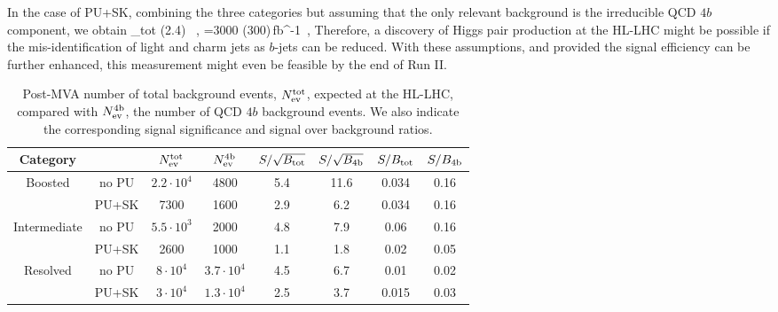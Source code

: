     
    In the case of PU+SK, combining the three categories but assuming that
    the only relevant background is the irreducible QCD $4b$ component,
    we obtain
    \be
\lp {}\rp_{\rm tot} (2.4) \, ,\quad
{}=3000 (300)\,{\rm fb}^{-1}\, ,
\ee
Therefore, a discovery of Higgs pair production at the
HL-LHC might be possible if the
mis-identification of light and charm jets as
$b$-jets can be  reduced.
%
With these assumptions, and provided
the signal efficiency can be further enhanced,
this measurement might even be feasible
by the end of Run II.


\begin{table}[h]
  \centering
  \small
  \begin{tabular}{|c|c|c|c||c|c||c|c|}
        \hline
        Category  &    &  $N_{\rm ev}^{\rm tot}$  &  $N_{\rm ev}^{\rm 4b}$   &
        $S/\sqrt{B_{\rm tot}}$ & $S/\sqrt{B_{\rm 4b}}$  
        &  $S/B_{\rm tot}$ & $S/B_{\rm 4b}$\\ 
    \hline
    \hline
    \multirow{2}{*}{Boosted} &  no PU  & $2.2\cdot 10^4$  & 4800    & 
      5.4 &  11.6 & 0.034 & 0.16 \\
    & PU+SK & 7300  &  1600  &  2.9  & 6.2 &  0.034 & 0.16 \\
    \hline
    \hline
    \multirow{2}{*}{Intermediate} &  no PU   & $5.5\cdot 10^3$  & 2000    &
    4.8  &  7.9 &  0.06  &  0.16 \\
    & PU+SK  & 2600   &  1000  & 1.1  & 1.8 & 0.02 & 0.05 \\
    \hline
    \hline
    \multirow{2}{*}{Resolved} &   no PU  & $8\cdot 10^4$   &
    $3.7\cdot 10^4$
    & 4.5  & 6.7  & 0.01 & 0.02 \\
    & PU+SK  &  $3\cdot 10^4$   &   $1.3\cdot 10^4$ & 2.5    & 3.7  & 0.015 & 0.03 \\
    \hline
      \end{tabular}
  \caption{\small Post-MVA number of total background events, $N_{\rm ev}^{\rm tot}$,
    expected at the HL-LHC, compared
    with $N_{\rm ev}^{\rm 4b}$,
    the number of QCD $4b$ background events.
    We also indicate the corresponding signal significance and signal over background
    ratios.
        \label{table:cutflowMVA_fakes}
  }
\end{table}




